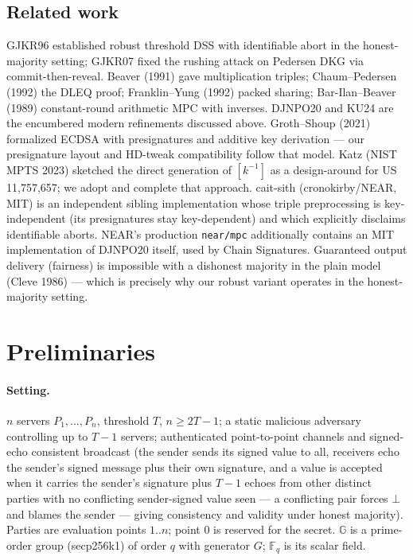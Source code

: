 \documentclass[11pt]{article}
\theoremstyle{plain}
\theoremstyle{definition}
\theoremstyle{remark}
\newcommand{\Fq}{\mathbb{F}_q}
\newcommand{\GG}{\mathbb{G}}
\newcommand{\share}[1]{[#1]}
\begin{document}
\subsection{Related work}

GJKR96 established robust threshold DSS with identifiable abort in the honest-majority setting; GJKR07 fixed the rushing attack on Pedersen DKG via commit-then-reveal. Beaver (1991) gave multiplication triples; Chaum--Pedersen (1992) the DLEQ proof; Franklin--Yung (1992) packed sharing; Bar-Ilan--Beaver (1989) constant-round arithmetic MPC with inverses. DJNPO20 and KU24 are the encumbered modern refinements discussed above. Groth--Shoup (2021) formalized ECDSA with presignatures and additive key derivation --- our presignature layout and HD-tweak compatibility follow that model. Katz (NIST MPTS 2023) sketched the direct generation of $\share{k^{-1}}$ as a design-around for US 11,757,657; we adopt and complete that approach. cait-sith (cronokirby/NEAR, MIT) is an independent sibling implementation whose triple preprocessing is key-independent (its presignatures stay key-dependent) and which explicitly disclaims identifiable aborts. NEAR's production \texttt{near/mpc} additionally contains an MIT implementation of DJNPO20 itself, used by Chain Signatures. Guaranteed output delivery (fairness) is impossible with a dishonest majority in the plain model (Cleve 1986) --- which is precisely why our robust variant operates in the honest-majority setting.

\section{Preliminaries}\label{sec:prelim}

\paragraph{Setting.} $n$ servers $P_1,\dots,P_n$, threshold $T$, $n \geq 2T{-}1$; a static malicious adversary controlling up to $T{-}1$ servers; authenticated point-to-point channels and signed-echo consistent broadcast (the sender sends its signed value to all, receivers echo the sender's signed message plus their own signature, and a value is accepted when it carries the sender's signature plus $T{-}1$ echoes from other distinct parties with no conflicting sender-signed value seen --- a conflicting pair forces $\bot$ and blames the sender --- giving consistency and validity under honest majority). Parties are evaluation points $1..n$; point $0$ is reserved for the secret. $\GG$ is a prime-order group (secp256k1) of order $q$ with generator $G$; $\Fq$ is its scalar field.
\end{document}
